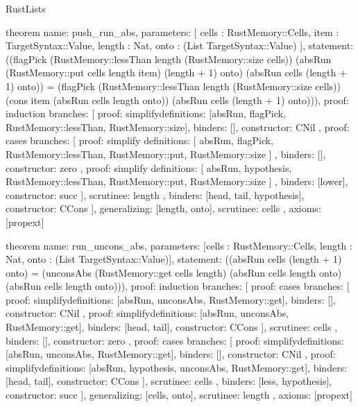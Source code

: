 \begin{lexlean}{RustLists}
\begin{semanticmodule}
theorem{
  name: push_run_abs,
  parameters: [
    cells : RustMemory::Cells,
    item : TargetSyntax::Value,
    length : Nat,
    onto : (List TargetSyntax::Value)
  ],
  statement: ((flagPick (RustMemory::lessThan length (RustMemory::size cells)) (absRun (RustMemory::put cells length item) (length + 1) onto) (absRun cells (length + 1) onto)) = (flagPick (RustMemory::lessThan length (RustMemory::size cells)) (cons item (absRun cells length onto)) (absRun cells (length + 1) onto))),
  proof: induction{
    branches: [
      {
        proof: simplify{definitions: [absRun, flagPick, RustMemory::lessThan, RustMemory::size]},
        binders: [],
        constructor: CNil
      },
      {
        proof: cases{
          branches: [
            {
              proof: simplify{
                definitions: [
                  absRun,
                  flagPick,
                  RustMemory::lessThan,
                  RustMemory::put,
                  RustMemory::size
                ]
              },
              binders: [],
              constructor: zero
            },
            {
              proof: simplify{
                definitions: [
                  absRun,
                  hypothesis,
                  RustMemory::lessThan,
                  RustMemory::put,
                  RustMemory::size
                ]
              },
              binders: [lower],
              constructor: succ
            }
          ],
          scrutinee: length
        },
        binders: [head, tail, hypothesis],
        constructor: CCons
      }
    ],
    generalizing: [length, onto],
    scrutinee: cells
  },
  axioms: [propext]
}

theorem{
  name: run_uncons_abs,
  parameters: [cells : RustMemory::Cells, length : Nat, onto : (List TargetSyntax::Value)],
  statement: ((absRun cells (length + 1) onto) = (unconsAbs (RustMemory::get cells length) (absRun cells length onto) (absRun cells length onto))),
  proof: induction{
    branches: [
      {
        proof: cases{
          branches: [
            {
              proof: simplify{definitions: [absRun, unconsAbs, RustMemory::get]},
              binders: [],
              constructor: CNil
            },
            {
              proof: simplify{definitions: [absRun, unconsAbs, RustMemory::get]},
              binders: [head, tail],
              constructor: CCons
            }
          ],
          scrutinee: cells
        },
        binders: [],
        constructor: zero
      },
      {
        proof: cases{
          branches: [
            {
              proof: simplify{definitions: [absRun, unconsAbs, RustMemory::get]},
              binders: [],
              constructor: CNil
            },
            {
              proof: simplify{definitions: [absRun, hypothesis, unconsAbs, RustMemory::get]},
              binders: [head, tail],
              constructor: CCons
            }
          ],
          scrutinee: cells
        },
        binders: [less, hypothesis],
        constructor: succ
      }
    ],
    generalizing: [cells, onto],
    scrutinee: length
  },
  axioms: [propext]
}


\end{semanticmodule}
\end{lexlean}
